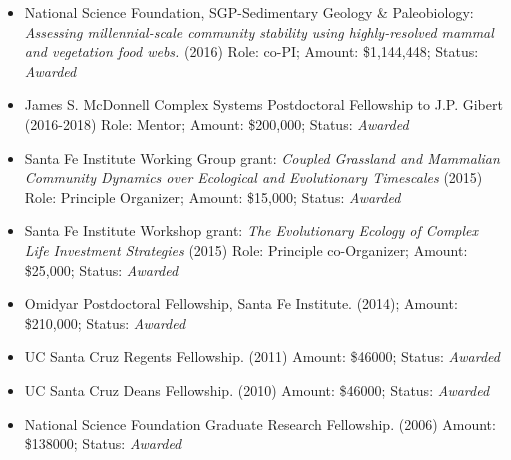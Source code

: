 \documentclass[margin,line,12pt]{res}
\begin{document}
\begin{resume}
\begin{itemize}
\item National Science Foundation, SGP-Sedimentary Geology \& Paleobiology: \emph{Assessing millennial-scale community stability using highly-resolved mammal and vegetation food webs.} (2016) Role: co-PI; Amount: \$1,144,448; Status: \emph{Awarded}

\item James S. McDonnell Complex Systems Postdoctoral Fellowship to J.P. Gibert (2016-2018) Role: Mentor; Amount: \$200,000; Status: \emph{Awarded}

\item Santa Fe Institute Working Group grant: \emph{Coupled Grassland and Mammalian Community Dynamics over Ecological and Evolutionary Timescales} (2015) Role: Principle Organizer; Amount: \$15,000; Status: \emph{Awarded}

\item Santa Fe Institute Workshop grant: \emph{The Evolutionary Ecology of Complex Life Investment Strategies} (2015) Role: Principle co-Organizer; Amount: \$25,000; Status: \emph{Awarded}

\item Omidyar Postdoctoral Fellowship, Santa Fe Institute. (2014); Amount: \$210,000; Status: \emph{Awarded}

\item UC Santa Cruz Regents Fellowship. (2011) Amount: \$46000; Status: \emph{Awarded}

\item UC Santa Cruz Deans Fellowship. (2010) Amount: \$46000; Status: \emph{Awarded}

\item National Science Foundation Graduate Research Fellowship. (2006) Amount: \$138000; Status: \emph{Awarded}





\end{itemize}
\end{resume}
\end{document}
